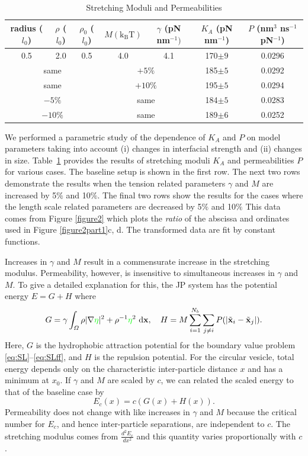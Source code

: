 \documentclass[lineno]{jfm}
\newcommand{\xx}{\mathbf{x}}
\newcommand{\ReviewerTwo}[1]{\textcolor{green}{#1}}
\begin{document}
\begin{table}
\caption{Stretching Moduli and Permeabilities}
\centering
\begin{tabular}{ c c c |c c| c |c }
 radius ($l_0$) &  $\rho$ ($l_0$)  &  $\rho_0$ ($l_0$) &  $M (\mathrm{k_BT})$ & $\gamma$ (pN nm$^{-1})$ & $K_A$ (pN nm$^{-1}$) & $P$ (nm$^3$ ns$^{-1}$pN$^{-1}$) \\
\hline      \hline 
 0.5 & 2.0  &   0.5  & 4.0 &  4.1  & 170$\pm9$   &  0.0296\\ 
%
 \multicolumn{3}{c|}{same} & \multicolumn{2}{c|}{$+ 5 \%$}  & 185$\pm5$  &  0.0292  \\ 
%
 \multicolumn{3}{c|}{same} & \multicolumn{2}{c|}{$+ 10 \%$}  & 195$\pm5$  &  0.0294 \\ 
%
 \multicolumn{3}{c|}{$- 5 \%$} & \multicolumn{2}{c|}{same}   & 184$\pm5$  &  0.0283 \\ 
%
 \multicolumn{3}{c|}{$- 10 \%$} & \multicolumn{2}{c|}{same}   & 189$\pm6$  &  0.0252  \\ 
\end{tabular} 
\label{table2}
\end{table}
%

We performed a parametric study of the dependence of $K_A$ and $P$
on model parameters taking into account   
(i) changes in interfacial strength and (ii) changes in size.
Table~\ref{table2} provides the results of stretching moduli $K_A$ and permeabilities $P$ for various cases.
 The baseline setup is shown in the first row.
The next two rows demonstrate the results when the tension related parameters $\gamma$ and $M$ are increased by 5$\%$ and 10$\%$. 
The final two rows show the results for the cases where the length scale related parameters are decreased by 5$\%$ and 10$\%$
This data comes from Figure \ref{figure2} which  plots the \emph{ratio} of the abscissa and ordinates
used in Figure \ref{figure2part1}c, d. The transformed data are fit by constant functions.  

Increases in $\gamma$ and $M$ result in
a commensurate increase in the stretching modulus. 
Permeability, however, is insensitive to simultaneous increases in $\gamma$ and $M$.
To give a detailed explanation for this, the JP system has the potential energy $E = G + H$ where 
\begin{equation}
\label{eq:baseline_energy}
G = \gamma \int_{\Omega} \rho |\nabla \ReviewerTwo{\eta}|^2 + \rho^{-1} \ReviewerTwo{\eta}^2 \,\dif\xx,\quad H = M \sum_{i=1}^{N_b}\sum_{j \neq i} 
       P(|\tilde{\xx}_i - \tilde{\xx}_j|).
\end{equation}
Here, $G$ is the hydrophobic attraction potential for the boundary value problem \eqref{eq:SL}--\eqref{eq:SLff},
and $H$ is the repulsion potential.  
For the circular vesicle, total energy depends only on the characteristic inter-particle distance $x$
and has a minimum at $x_0$. 
If $\gamma$ and $M$ are scaled by $c$, 
we can related the scaled energy to that of the baseline case by 
\[E_c(x) = c(G(x) + H(x)).\]
Permeability does not change with like increases in $\gamma$ and $M$
because the critical number for $E_c$, and hence inter-particle separations, are independent to $c$.
The stretching modulus comes from $\frac{d^2E_c}{dx^2}$ and this 
quantity varies proportionally with $c$. 
\end{document}
